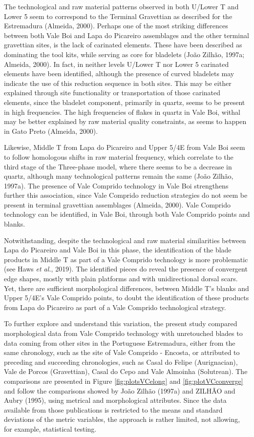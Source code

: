 \documentclass[12pt,twoside]{reedthesis}
\begin{document}
The technological and raw material patterns observed in both U/Lower T and Lower 5 seem to correspond to the Terminal Gravettian as described for the Estremadura (Almeida, 2000). Perhaps one of the most striking differences between both Vale Boi and Lapa do Picareiro assemblages and the other terminal gravettian sites, is the lack of carinated elements. These have been described as dominating the tool kits, while serving as core for bladelets (João Zilhão, 1997a; Almeida, 2000). In fact, in neither levels U/Lower T nor Lower 5 carinated elements have been identified, although the presence of curved bladelets may indicate the use of this reduction sequence in both sites. This may be either explained through site functionality or transportation of those carinated elements, since the bladelet component, primarily in quartz, seems to be present in high frequencies. The high frequencies of flakes in quartz in Vale Boi, withal may be better explained by raw material quality constraints, as seems to happen in Gato Preto (Almeida, 2000).

Likewise, Middle T from Lapa do Picareiro and Upper 5/4E from Vale Boi seem to follow homologous shifts in raw material frequency, which correlate to the third stage of the Three-phase model, where there seems to be a decrease in quartz, although many technological patterns remain the same (João Zilhão, 1997a). The presence of Vale Comprido technology in Vale Boi strengthens further this association, since Vale Comprido reduction strategies do not seem be present in terminal gravettian assemblages (Almeida, 2000). Vale Comprido technology can be identified, in Vale Boi, through both Vale Comprido points and blanks.

Notwithstanding, despite the technological and raw material similarities between Lapa do Picareiro and Vale Boi in this phase, the identification of the blade products in Middle T as part of a Vale Comprido technology is more problematic (see Haws \emph{et al.}, 2019). The identified pieces do reveal the presence of convergent edge shapes, mostly with plain platforms and with unidirectional dorsal scars. Yet, there are sufficient morphological differences, between Middle T's blanks and Upper 5/4E's Vale Comprido points, to doubt the identification of these products from Lapa do Picareiro as part of a Vale Comprido technological strategy.

To further explore and understand this variation, the present study compared morphological data from Vale Comprido technology with unretouched blades to data coming from other sites in the Portuguese Estremadura, either from the same chronology, such as the site of Vale Comprido - Encosta, or attributed to preceding and succeeding chronologies, such as Casal do Felipe (Aurignacian), Vale de Porcos (Gravettian), Casal do Cepo and Vale Almoinha (Solutrean). The comparisons are presented in Figure \ref{fig:plotsVCelong} and \ref{fig:plotVCconverge} and follow the comparisons showed by João Zilhão (1997a) and ZILHÃO and Aubry (1995), using metrical and morphological attributes. Since the data available from those publications is restricted to the means and standard deviations of the metric variables, the approach is rather limited, not allowing, for example, statistical testing.
\end{document}
